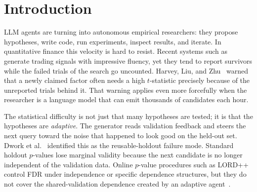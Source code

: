 \documentclass[sigconf]{acmart}
\theoremstyle{plain}
\begin{document}

\maketitle

\section{Introduction}\label{sec:intro}

LLM agents are turning into autonomous empirical researchers: they propose
hypotheses, write code, run experiments, inspect results, and iterate. In
quantitative finance this velocity is hard to resist. Recent systems such as
\cite{factormad,quantaalpha,alphacrafter,qrafti} generate trading signals with
impressive fluency, yet they tend to report survivors while the failed trials
of the search go uncounted. Harvey, Liu, and Zhu~\cite{harvey2016} warned that
a newly claimed factor often needs a high $t$-statistic precisely because of
the unreported trials behind it. That warning applies even more forcefully when
the researcher is a language model that can emit thousands of candidates each
hour.

The statistical difficulty is not just that many hypotheses are tested; it is
that the hypotheses are \emph{adaptive}. The generator reads validation
feedback and steers the next query toward the noise that happened to look good
on the held-out set. Dwork et al.~\cite{dwork2015} identified this as the
reusable-holdout failure mode. Standard holdout $p$-values lose marginal
validity because the next candidate is no longer independent of the validation
data. Online $p$-value procedures such as LORD++~\cite{javanmard2018,ramdas2017}
control FDR under independence or specific dependence structures, but they do
not cover the shared-validation dependence created by an adaptive
agent~\cite{sargsyan2025}.
\end{document}
